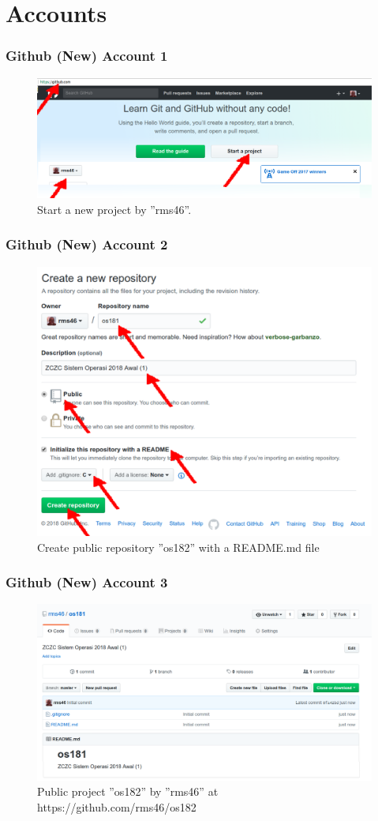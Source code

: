 \documentclass[xcolor=table, notheorems, hyperref={pdfpagelabels=false}]{beamer}
\begin{document}
\section{Accounts}
\begin{frame}
\frametitle{Github (New) Account 1}
\begin{figure}
\includegraphics[width=0.91\linewidth]{os00-akun-git-1}
\caption{Start a new project by ''rms46''.}
\end{figure}
\end{frame}

\begin{frame}
\frametitle{Github (New) Account 2}
\begin{figure}
\includegraphics[width=0.70\linewidth]{os00-akun-git-2}
\caption{Create public repository ''os182'' with a README.md file}
\end{figure}
\end{frame}

\begin{frame}
\frametitle{Github (New) Account 3}
\begin{figure}
\includegraphics[width=0.91\linewidth]{os00-akun-git-3}
\caption{Public project ''os182'' by ''rms46'' at https://github.com/rms46/os182}
\end{figure}
\end{frame}
\end{document}
